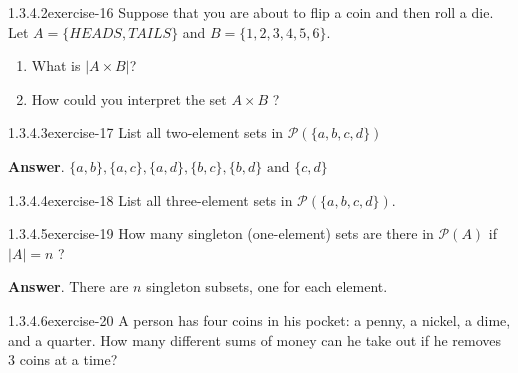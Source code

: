 \documentclass[twoside,10pt,]{book}
\numberwithin{equation}{section}
\begin{document}
\begin{divisionsolution}{1.3.4.2}{}{exercise-16}%
\hypertarget{p-369}{}%
Suppose that you are about to flip a coin and then roll a die. Let \(A = \{HEADS, TAILS\}\) and  \(B = \{1, 2, 3, 4, 5, 6\}\).%
\par
\hypertarget{p-370}{}%
\leavevmode%
\begin{enumerate}[label=(\alph*)]
\item\hypertarget{li-287}{}\hypertarget{p-371}{}%
What is \(|A \times  B|\)?%
\item\hypertarget{li-288}{}\hypertarget{p-372}{}%
How could you interpret the set \(A \times  B\) ?%
\end{enumerate}
%
\end{divisionsolution}%
\begin{divisionsolution}{1.3.4.3}{}{exercise-17}%
\hypertarget{p-373}{}%
List all two-element sets in \(\mathcal{P}(\{a,b,c,d\})\)%
\par\smallskip%
\noindent\textbf{Answer}.\quad%
\hypertarget{p-374}{}%
\(\{a, b\}, \{a, c\}, \{a, d\}, \{b, c\}, \{b, d\} \textrm{ and } \{c, d\}\)%
\end{divisionsolution}%
\begin{divisionsolution}{1.3.4.4}{}{exercise-18}%
\hypertarget{p-375}{}%
List all three-element sets in \(\mathcal{P}(\{a, b, c,d\})\).%
\end{divisionsolution}%
\begin{divisionsolution}{1.3.4.5}{}{exercise-19}%
\hypertarget{p-376}{}%
How many singleton (one-element) sets are there in \(\mathcal{P}(A)\) if \(\lvert A \rvert =n\) ?%
\par\smallskip%
\noindent\textbf{Answer}.\quad%
\hypertarget{p-377}{}%
There are \(n\) singleton subsets, one for each element.%
\end{divisionsolution}%
\begin{divisionsolution}{1.3.4.6}{}{exercise-20}%
\hypertarget{p-378}{}%
A person has four coins in his pocket: a penny, a nickel, a dime, and a quarter. How many different sums of money can he take out if he removes 3 coins at a time?%
\end{divisionsolution}%
\end{document}
